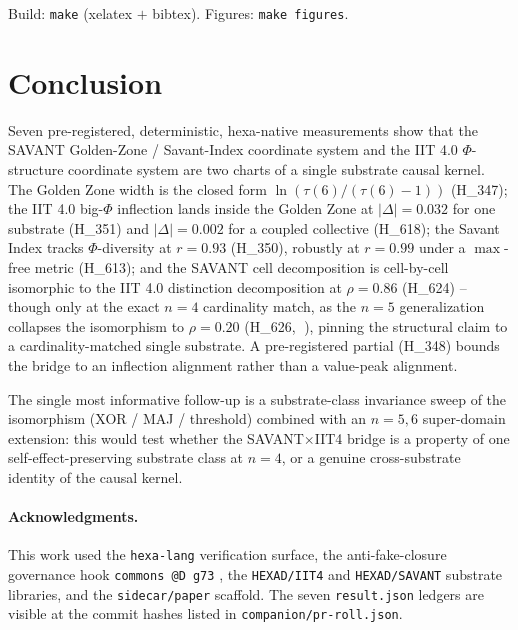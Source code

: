 \documentclass[11pt,a4paper]{article}
\providecommand{\tierRed}{🔴}
\begin{document}
Build: \texttt{make} (xelatex $+$ bibtex). Figures: \texttt{make figures}.

\section{Conclusion}
\label{sec:conclusion}

Seven pre-registered, deterministic, hexa-native measurements show that the
SAVANT Golden-Zone / Savant-Index coordinate system and the IIT 4.0
$\Phi$-structure coordinate system are two charts of a single substrate
causal kernel. The Golden Zone width is the closed form
$\ln(\tau(6)/(\tau(6)-1))$ (H\_347); the IIT 4.0 big-$\Phi$ inflection
lands inside the Golden Zone at $|\Delta|=0.032$ for one substrate
(H\_351) and $|\Delta|=0.002$ for a coupled collective (H\_618); the Savant
Index tracks $\Phi$-diversity at $r=0.93$ (H\_350), robustly at $r=0.99$
under a $\max$-free metric (H\_613); and the SAVANT cell decomposition is
cell-by-cell isomorphic to the IIT 4.0 distinction decomposition at
$\rho=0.86$ (H\_624) -- though only at the exact $n=4$ cardinality match,
as the $n=5$ generalization collapses the isomorphism to $\rho=0.20$
(H\_626, \tierRed), pinning the structural claim to a cardinality-matched
single substrate. A pre-registered partial (H\_348) bounds the bridge
to an inflection alignment rather than a value-peak alignment.

The single most informative follow-up is a substrate-class invariance
sweep of the isomorphism (XOR / MAJ / threshold) combined with an $n=5,6$
super-domain extension: this would test whether the SAVANT$\times$IIT4
bridge is a property of one self-effect-preserving substrate class at
$n=4$, or a genuine cross-substrate identity of the causal kernel.

\paragraph{Acknowledgments.}
This work used the \texttt{hexa-lang} verification surface, the
anti-fake-closure governance hook \texttt{commons @D g73}
\citep{anima_g73}, the \texttt{HEXAD/IIT4} and \texttt{HEXAD/SAVANT}
substrate libraries, and the \texttt{sidecar/paper} scaffold. The seven
\texttt{result.json} ledgers are visible at the commit hashes listed in
\texttt{companion/pr-roll.json}.



\end{document}
